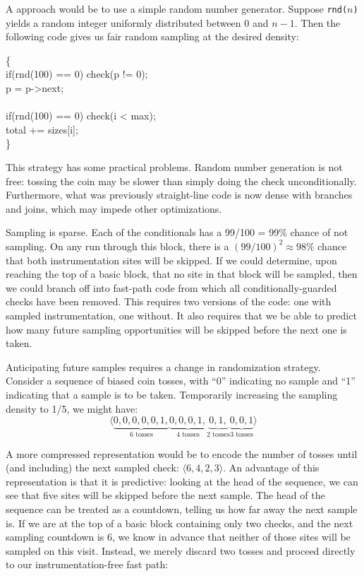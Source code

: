 A \naive approach would be to use a simple random number
generator.  Suppose \texttt{rnd($n$)} yields
a random integer uniformly distributed between 0 and $n-1$.  Then the
following code gives us fair random sampling at the desired
density:

\begin{code}
  \{\+ \\
  if(rnd(100) == 0) check(p != 0); \\
  \up p = p->next; \\
  \\
  if(rnd(100) == 0) check(i < max); \\
  \up total += sizes[i]; \\
  \<\}
\end{code}

This strategy has some practical problems.  Random number generation
is not free: tossing the coin may be slower than simply doing the
check unconditionally.  Furthermore, what was previously straight-line
code is now dense with branches and joins, which may impede other
optimizations.

Sampling is sparse.  Each of the conditionals has a 99/100 = 99\%
chance of not sampling.  On any run through this block, there is a
$(99/100)^2 \approx 98\%$ chance that both instrumentation sites will
be skipped.  If we could determine, upon reaching the top of a basic
block, that no site in that block will be sampled, then we could
branch off into fast-path code from which all conditionally-guarded
checks have been removed.  This requires two versions of the code:
one with sampled instrumentation, one without.  It also requires that
we be able to predict how many future sampling opportunities will be
skipped before the next one is taken.

Anticipating future samples requires a change in randomization
strategy.  Consider a sequence of biased coin tosses, with ``0''
indicating no sample and ``1'' indicating that a sample is to be
taken.  Temporarily increasing the sampling density to 1/5, we might
have:
\begin{equation*}
  \langle
    \underbrace{0, 0, 0, 0, 0, 1,}_{\text{6 tosses}}
    \underbrace{0, 0, 0, 1,}_{\text{4 tosses}}
    \underbrace{0, 1,}_{\text{2 tosses}}
    \underbrace{0, 0, 1}_{\text{3 tosses}}
    \rangle
\end{equation*}

A more compressed representation would be to encode the number of
tosses until (and including) the next sampled check: $\langle 6, 4, 2,
3 \rangle$.  An advantage of this representation is that it is
predictive: looking at the head of the sequence, we can see that five
sites will be skipped before the next sample.  The head of the
sequence can be treated as a countdown, telling us how far away the
next sample is.  If we are at the top of a basic block containing only
two checks, and the next sampling countdown is 6, we know in advance
that neither of those sites will be sampled on this visit.  Instead,
we merely discard two tosses and proceed directly to our
instrumentation-free fast path:


